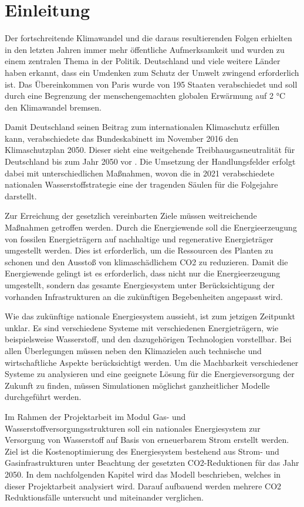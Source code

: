 \section{Einleitung}

Der fortschreitende Klimawandel und die daraus resultierenden Folgen erhielten in den letzten Jahren immer mehr öffentliche Aufmerksamkeit und wurden zu einem zentralen Thema in der Politik. Deutschland und viele weitere Länder haben erkannt, dass ein Umdenken zum Schutz der Umwelt zwingend erforderlich ist. Das Übereinkommen von Paris wurde von 195 Staaten verabschiedet und soll durch eine Begrenzung der menschengemachten globalen Erwärmung auf 2 °C den Klimawandel bremsen. 

Damit Deutschland seinen Beitrag zum internationalen Klimaschutz erfüllen kann, verabschiedete das Bundeskabinett im November 2016 den Klimaschutzplan 2050. Dieser sieht eine weitgehende Treibhausgasneutralität für Deutschland bis zum Jahr 2050 vor \cite{bmu}.
Die Umsetzung der Handlungsfelder erfolgt dabei mit unterschiedlichen Maßnahmen, wovon die in 2021 verabschiedete nationalen Wasserstoffstrategie eine der tragenden Säulen für die Folgejahre darstellt. \cite{bmbfNatH2}

Zur Erreichung der gesetzlich vereinbarten Ziele müssen weitreichende Maßnahmen getroffen werden.
Durch die Energiewende soll die Energieerzeugung von fossilen Energieträgern auf nachhaltige und regenerative Energieträger umgestellt werden.  Dies ist erforderlich, um die Ressourcen des Planten zu schonen und den Ausstoß von klimaschädlichem CO2 zu reduzieren. Damit die Energiewende gelingt ist es erforderlich, dass nicht nur die Energieerzeugung umgestellt, sondern das gesamte Energiesystem unter Berücksichtigung der vorhanden Infrastrukturen an die zukünftigen Begebenheiten angepasst wird.

Wie das zukünftige nationale Energiesystem aussieht, ist zum jetzigen Zeitpunkt unklar. Es sind verschiedene Systeme mit verschiedenen Energieträgern, wie beispielsweise Wasserstoff, und den dazugehörigen Technologien vorstellbar. 
Bei allen Überlegungen müssen neben den Klimazielen auch technische und wirtschaftliche Aspekte berücksichtigt werden. 
Um die Machbarkeit verschiedener Systeme zu analysieren und eine geeignete Lösung für die Energieversorgung der Zukunft zu finden, müssen Simulationen möglichst ganzheitlicher Modelle durchgeführt werden.

Im Rahmen der Projektarbeit im Modul Gas- und Wasserstoffversorgungsstrukturen soll ein nationales Energiesystem zur Versorgung von Wasserstoff auf Basis von erneuerbarem Strom erstellt werden. Ziel ist die Kostenoptimierung des Energiesystem bestehend aus Strom- und Gasinfrastrukturen unter Beachtung der gesetzten CO2-Reduktionen für das Jahr 2050. In dem nachfolgenden Kapitel wird das Modell beschrieben, welches in dieser Projektarbeit analysiert wird. Darauf aufbauend werden mehrere CO2 Reduktionsfälle untersucht und miteinander verglichen.